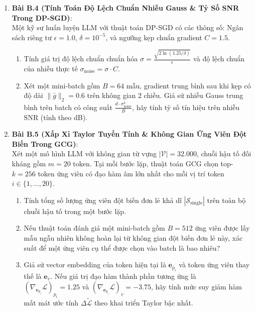 \begin{enumerate}
  \item \textbf{Bài B.4 (Tính Toán Độ Lệch Chuẩn Nhiễu Gauss \& Tỷ Số SNR Trong DP-SGD)}: \\
  Một kỹ sư huấn luyện LLM với thuật toán DP-SGD có các thông số: Ngân sách riêng tư $\epsilon = 1.0$, $\delta = 10^{-5}$, và ngưỡng kẹp chuẩn gradient $C = 1.5$.
  \begin{enumerate}
    \item Tính giá trị độ lệch chuẩn chuẩn hóa $\sigma = \frac{\sqrt{2 \ln(1.25/\delta)}}{\epsilon}$ và độ lệch chuẩn của nhiễu thực tế $\sigma_{\text{noise}} = \sigma \cdot C$.
    \item Xét một mini-batch gồm $B = 64$ mẫu, gradient trung bình sau khi kẹp có độ dài $\|\bar{g}\|_2 = 0.6$ trên không gian 2 chiều. Giả sử nhiễu Gauss trung bình trên batch có công suất $\frac{d \cdot \sigma_{\text{noise}}^2}{B}$, hãy tính tỷ số tín hiệu trên nhiễu $\text{SNR}$ (tính theo dB).
  \end{enumerate}

  \item \textbf{Bài B.5 (Xấp Xỉ Taylor Tuyến Tính \& Không Gian Ứng Viên Đột Biến Trong GCG)}: \\
  Xét một mô hình LLM với không gian từ vựng $|\mathcal{V}| = 32.000$, chuỗi hậu tố đối kháng gồm $m = 20$ token.
  Tại mỗi bước lặp, thuật toán GCG chọn top-$k = 256$ token ứng viên có đạo hàm âm lớn nhất cho mỗi vị trí token $i \in \{1, \dots, 20\}$.
  \begin{enumerate}
    \item Tính tổng số lượng ứng viên đột biến đơn lẻ khả dĩ $|\mathcal{S}_{\text{single}}|$ trên toàn bộ chuỗi hậu tố trong một bước lặp.
    \item Nếu thuật toán đánh giá một mini-batch gồm $B = 512$ ứng viên được lấy mẫu ngẫu nhiên không hoàn lại từ không gian đột biến đơn lẻ này, xác suất để một ứng viên cụ thể được chọn vào batch là bao nhiêu?
    \item Giả sử vector embedding của token hiện tại là $\mathbf{e}_{p_i}$ và token ứng viên thay thế là $\mathbf{e}_v$. Nếu giá trị đạo hàm thành phần tương ứng là $(\nabla_{\mathbf{e}_{p_i}} \mathcal{L})_{p_i} = 1.25$ và $(\nabla_{\mathbf{e}_{p_i}} \mathcal{L})_v = -3.75$, hãy tính mức suy giảm hàm mất mát ước tính $\Delta \tilde{\mathcal{L}}$ theo khai triển Taylor bậc nhất.
  \end{enumerate}


\end{enumerate}
